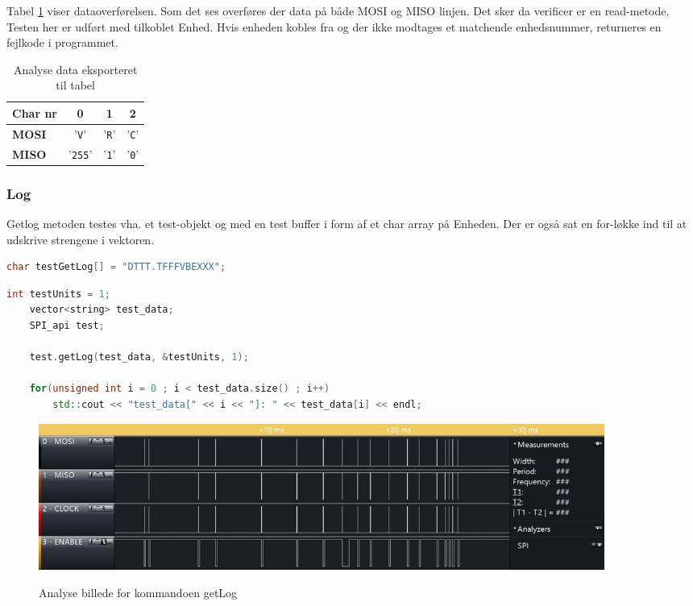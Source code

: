 Tabel \ref{table:scop_verify} viser dataoverførelsen. Som det ses overføres der data på både MOSI og MISO linjen. Det sker da verificer er en read-metode. Testen her er udført med tilkoblet Enhed. Hvis enheden kobles fra og der ikke modtages et matchende enhedsnummer, returneres en fejlkode i programmet. 
 

\begin{table}[H]
	\caption{Analyse data eksporteret til tabel}
	\centering
	\begin{tabular}{|l|c|c|c|}
		\hline 
		\textbf{Char nr} & \textbf{0} & \textbf{1} & \textbf{2}\\ 		
		\hline 
		\textbf{MOSI} & '\verb+V+' & '\verb+R+'  & '\verb+C+'\\ 
		\hline 
		\textbf{MISO} & '\verb+255+' & '\verb+1+' & '\verb+0+' \\ 
		\hline 
	\end{tabular} 
	\label{table:scop_verify}
\end{table}



\subsubsection*{Log}
Getlog metoden testes vha. et test-objekt og med en test buffer i form af et char array på Enheden. Der er også sat en for-løkke ind til at udskrive strengene i vektoren.

\begin{lstlisting}[language=C]
char testGetLog[] = "DTTT.TFFFVBEXXX";
\end{lstlisting}

\begin{lstlisting}[language=C++]
	int testUnits = 1;
	vector<string> test_data;
	SPI_api test;

	test.getLog(test_data, &testUnits, 1);
	
	for(unsigned int i = 0 ; i < test_data.size() ; i++)
		std::cout << "test_data[" << i << "]: " << test_data[i] << endl;
\end{lstlisting}

\begin{figure}[H]
\centering
{\includegraphics[width=0.90\textwidth]{filer/integrationstest/billeder/spi_getlog_and_error}}
\caption{Analyse billede for kommandoen getLog}
\label{lab:scop_getlog}
\end{figure}

